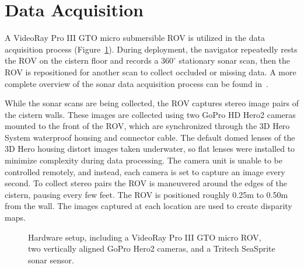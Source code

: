 \documentclass{llncs}
\begin{document}
\section{Data Acquisition}
\label{sec:data}
\noindent A VideoRay Pro III GTO micro submersible ROV is utilized in the data acquisition process (Figure~\ref{fig:ROV}). 
During deployment, the navigator repeatedly rests the ROV on the cistern floor and records a $360^{\circ}$ stationary sonar scan, then the ROV is repositioned for another scan to collect occluded or missing data. 
A more complete overview of the sonar data acquisition process can be found in~\cite{ClarkVast}. 

While the sonar scans are being collected, the ROV captures stereo image pairs of the cistern walls. These images are collected using two GoPro HD Hero2 cameras mounted to the front of the ROV, which are synchronized through the 3D Hero System waterproof housing and connector cable. The default domed lenses of the 3D Hero housing distort images taken underwater, so flat lenses were installed to minimize complexity during data processing. The camera unit is unable to be controlled remotely, and instead, each camera is set to capture an image every second. To collect stereo pairs the ROV is maneuvered around the edges of the cistern, pausing every few feet. The ROV is positioned roughly 0.25m to 0.50m from the wall. The images captured at each location are used to create disparity maps.

\begin{figure}[!h]
   \vspace{-0.2cm}
   \caption{Hardware setup, including a VideoRay Pro III GTO micro ROV, two vertically aligned GoPro Hero2 cameras, and a Tritech SeaSprite sonar sensor.}
  \label{fig:ROV}
 \end{figure}
 
\end{document}
